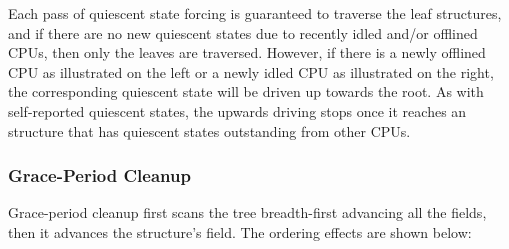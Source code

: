 \begin{center}
\end{center}

Each pass of quiescent state forcing is guaranteed to traverse the leaf
 structures, and if there are no new quiescent states due to
recently idled and/or offlined CPUs, then only the leaves are traversed.
However, if there is a newly offlined CPU as illustrated on the left or
a newly idled CPU as illustrated on the right, the corresponding
quiescent state will be driven up towards the root.
As with
self-reported quiescent states, the upwards driving stops once it
reaches an  structure that has quiescent states outstanding
from other CPUs.

\QuickQuizEnd


\subsubsection{Grace-Period Cleanup}
\label{sec:rcu:memorder:Grace-Period Cleanup}

Grace-period cleanup first scans the  tree breadth-first
advancing all the  fields, then it advances the
 structure's  field. The ordering effects are
shown below:

